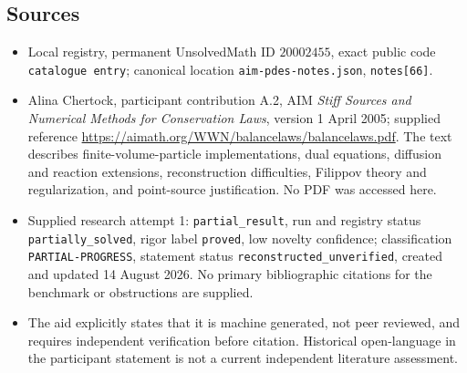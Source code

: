 \documentclass[11pt]{article}
\begin{document}
\subsection{Sources}
\begin{itemize}
\item Local registry, permanent UnsolvedMath ID \(20002455\), exact public code \texttt{catalogue entry}; canonical location \texttt{aim-pdes-notes.json}, \texttt{notes[66]}.
\item Alina Chertock, participant contribution A.2, AIM \emph{Stiff Sources and Numerical Methods for Conservation Laws}, version 1 April 2005; supplied reference \url{https://aimath.org/WWN/balancelaws/balancelaws.pdf}. The text describes finite-volume-particle implementations, dual equations, diffusion and reaction extensions, reconstruction difficulties, Filippov theory and regularization, and point-source justification. No PDF was accessed here.
\item Supplied research attempt 1: \texttt{partial\_result}, run and registry status \texttt{partially\_solved}, rigor label \texttt{proved}, low novelty confidence; classification \texttt{PARTIAL-PROGRESS}, statement status \texttt{reconstructed\_unverified}, created and updated 14 August 2026. No primary bibliographic citations for the benchmark or obstructions are supplied.
\item The aid explicitly states that it is machine generated, not peer reviewed, and requires independent verification before citation. Historical open-language in the participant statement is not a current independent literature assessment.
\end{itemize}
\end{document}

